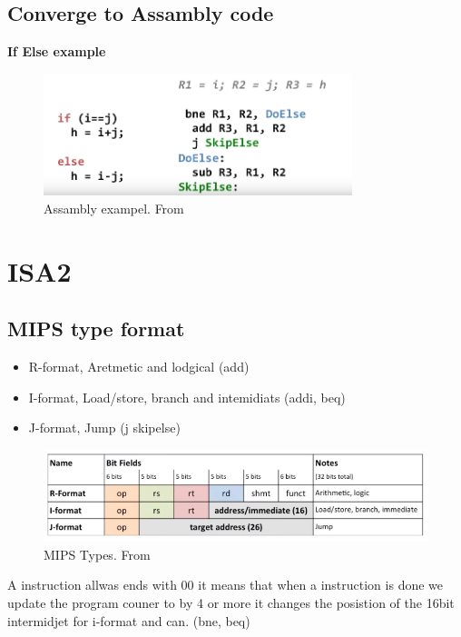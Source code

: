\subsection{Converge to Assambly code}
\noindent\textbf{If Else example} \newline
\begin{figure}[H]
    \centering
    \includegraphics[width=9cm]{image/assambly-exampel.png} 
    \caption{Assambly exampel. From \cite{ca}}
    \label{Assambly-exampel}
\end{figure}

\section{ISA2}
\subsection{MIPS type format}
\begin{itemize}
\item  R-format, Aretmetic and lodgical (add)
\item  I-format, Load/store, branch and intemidiats (addi, beq)
\item  J-format, Jump (j skipelse) 
\end{itemize}

\begin{figure}[H]
    \centering
    \includegraphics[width=14cm]{image/mips-types.png} 
    \caption{MIPS Types. From \cite{ca}}
    \label{MIPS-Types}
\end{figure}

A instruction allwas ends with 00 it means that when a instruction is done we update the program couner
to by 4 or more it changes the posistion of the 16bit intermidjet for i-format and can. (bne, beq)

